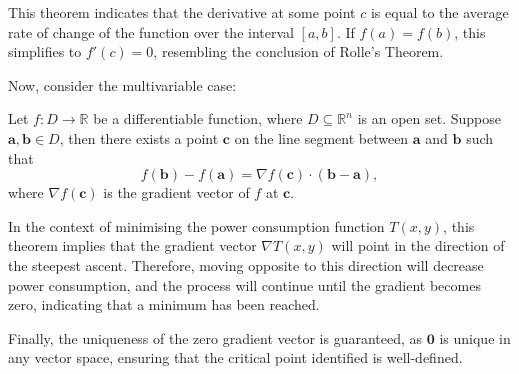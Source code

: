 \documentclass[12pt,a4paper]{article}
\begin{document}
\begin{solution}
This theorem indicates that the derivative at some point \( c \) is equal to the average rate of change of the function over the interval \([a, b]\). If \( f(a) = f(b) \), this simplifies to \( f'(c) = 0 \), resembling the conclusion of Rolle's Theorem.

Now, consider the multivariable case:

\begin{theorem}
    Let \( f: D \rightarrow \mathbb{R} \) be a differentiable function, where \( D \subseteq \mathbb{R}^n \) is an open set. Suppose \( \mathbf{a}, \mathbf{b} \in D \), then there exists a point \( \mathbf{c} \) on the line segment between \( \mathbf{a} \) and \( \mathbf{b} \) such that
    \[
    f(\mathbf{b}) - f(\mathbf{a}) = \nabla f(\mathbf{c}) \cdot (\mathbf{b} - \mathbf{a}),
    \]
    where \( \nabla f(\mathbf{c}) \) is the gradient vector of \( f \) at \( \mathbf{c} \).
\end{theorem}

In the context of minimising the power consumption function \( T(x, y) \), this theorem implies that the gradient vector \( \nabla T(x, y) \) will point in the direction of the steepest ascent. Therefore, moving opposite to this direction will decrease power consumption, and the process will continue until the gradient becomes zero, indicating that a minimum has been reached.

Finally, the uniqueness of the zero gradient vector is guaranteed, as \( \mathbf{0} \) is unique in any vector space, ensuring that the critical point identified is well-defined.
\end{solution}
\end{document}
